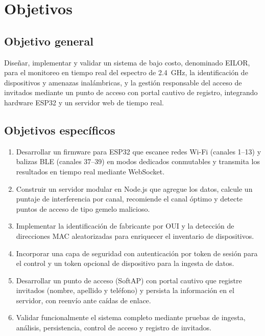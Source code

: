 \chapter{Objetivos}
\label{cap:objetivos}

\section{Objetivo general}
Diseñar, implementar y validar un sistema de bajo costo, denominado EILOR, para el monitoreo en tiempo real del espectro de 2.4~GHz, la identificación de dispositivos y amenazas inalámbricas, y la gestión responsable del acceso de invitados mediante un punto de acceso con portal cautivo de registro, integrando hardware ESP32 y un servidor web de tiempo real.

\section{Objetivos específicos}
\begin{enumerate}[label=\textbf{OE\arabic*.},leftmargin=2.4em]
  \item Desarrollar un firmware para ESP32 que escanee redes Wi\nobreakdash-Fi (canales 1--13) y balizas BLE (canales 37--39) en modos dedicados conmutables y transmita los resultados en tiempo real mediante WebSocket.
  \item Construir un servidor modular en Node.js que agregue los datos, calcule un puntaje de interferencia por canal, recomiende el canal óptimo y detecte puntos de acceso de tipo gemelo malicioso.
  \item Implementar la identificación de fabricante por OUI y la detección de direcciones MAC aleatorizadas para enriquecer el inventario de dispositivos.
  \item Incorporar una capa de seguridad con autenticación por token de sesión para el control y un token opcional de dispositivo para la ingesta de datos.
  \item Desarrollar un punto de acceso (SoftAP) con portal cautivo que registre invitados (nombre, apellido y teléfono) y persista la información en el servidor, con reenvío ante caídas de enlace.
  \item Validar funcionalmente el sistema completo mediante pruebas de ingesta, análisis, persistencia, control de acceso y registro de invitados.
\end{enumerate}

